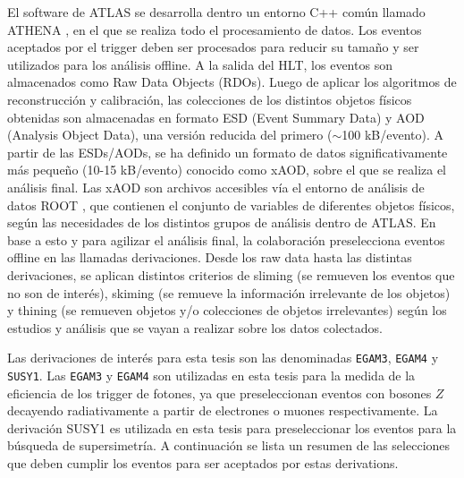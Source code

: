 El software de ATLAS se desarrolla dentro un entorno C++ común llamado ATHENA \cite{ATLAS-TDR-17, analysistools, athena}, en el que se realiza todo el procesamiento de datos. Los eventos aceptados por el trigger deben ser procesados para reducir su tamaño y ser utilizados para los análisis offline. A la salida del HLT, los eventos son almacenados como Raw Data Objects (RDOs). Luego de aplicar los algoritmos de reconstrucción y calibración, las colecciones de los distintos objetos físicos obtenidas son almacenadas en formato ESD (Event Summary Data) y AOD (Analysis Object Data), una versión reducida del primero ($\sim$100 kB/evento). A partir de las ESDs/AODs, se ha definido un formato de datos significativamente más pequeño (10-15 kB/evento) conocido como xAOD, sobre el que se realiza el análisis final. Las xAOD son archivos accesibles vía el entorno de análisis de datos ROOT \cite{root}, que contienen el conjunto de variables de diferentes objetos físicos, según las necesidades de los distintos grupos de análisis dentro de ATLAS. En base a esto y para agilizar el análisis final, la colaboración preselecciona eventos offline en las llamadas derivaciones. Desde los raw data hasta las distintas derivaciones, se aplican distintos criterios de sliming (se remueven los eventos que no son de interés), skiming (se remueve la información irrelevante de los objetos) y thining (se remueven objetos y/o colecciones de objetos irrelevantes) según los estudios y análisis que se vayan a realizar sobre los datos colectados.

Las derivaciones de interés para esta tesis son las denominadas \texttt{EGAM3}, \texttt{EGAM4} y \texttt{SUSY1}. Las \texttt{EGAM3} y \texttt{EGAM4} son utilizadas en esta tesis para la medida de la eficiencia de los trigger de fotones, ya que preseleccionan eventos con bosones $Z$ decayendo radiativamente a partir de electrones o muones respectivamente. La derivación SUSY1 es utilizada en esta tesis para preseleccionar los eventos para la búsqueda de supersimetría. A continuación se lista un resumen de las selecciones que deben cumplir los eventos para ser aceptados por estas derivations.


